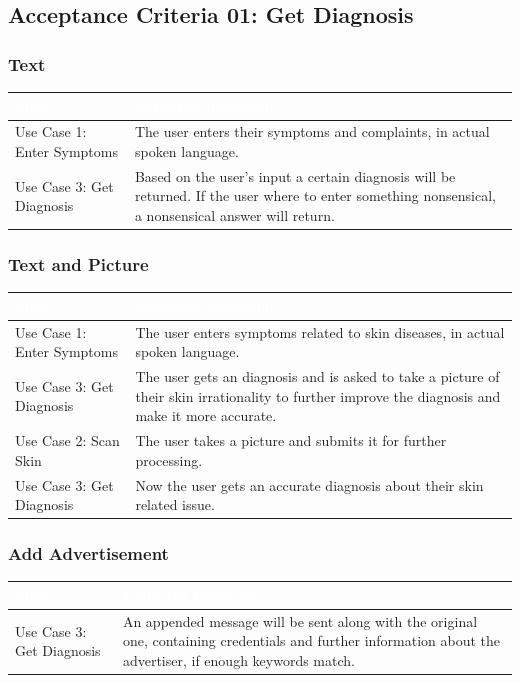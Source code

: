 \documentclass[12pt]{article}
\theoremstyle{definition}
\begin{document}
\subsection{Acceptance Criteria 01: Get Diagnosis}
\subsubsection{Text}
\begin{tabular}{|p{.2\linewidth}|p{.65\linewidth}|}
\hline 
\cellcolor[gray]{0.5}\textcolor{white}{Steps} & \cellcolor[gray]{0.5}\textcolor{white}{Expected behaviour} \\ \hline
Use Case 1: Enter Symptoms & The user enters their symptoms and complaints, in actual spoken language. \\ \hline
Use Case 3: Get Diagnosis & Based on the user's input a certain diagnosis will be returned. If the user where to enter something nonsensical, a nonsensical answer will return.  \\ \hline
\end{tabular}

\subsubsection{Text and Picture}
\begin{tabular}{|p{.2\linewidth}|p{.65\linewidth}|}
\hline 
\cellcolor[gray]{0.5}\textcolor{white}{Steps} & \cellcolor[gray]{0.5}\textcolor{white}{Expected behaviour} \\ \hline
Use Case 1: Enter Symptoms & The user enters symptoms related to skin diseases, in actual spoken language. \\ \hline
Use Case 3: Get Diagnosis & The user gets an diagnosis and is asked to take a picture of their skin irrationality to further improve the diagnosis and make it more accurate. \\ \hline
Use Case 2: Scan Skin & The user takes a picture and submits it for further processing. \\ \hline
Use Case 3: Get Diagnosis & Now the user gets an accurate diagnosis about their skin related issue. \\ \hline
\end{tabular}

\subsubsection{Add Advertisement}
\begin{tabular}{|p{.2\linewidth}|p{.65\linewidth}|}
\hline 
\cellcolor[gray]{0.5}\textcolor{white}{Steps} & \cellcolor[gray]{0.5}\textcolor{white}{Expected behaviour} \\ \hline
Use Case 3: Get Diagnosis & An appended message will be sent along with the original one, containing credentials and further information about the advertiser, if enough keywords match.  \\ \hline
\end{tabular}
\end{document}
